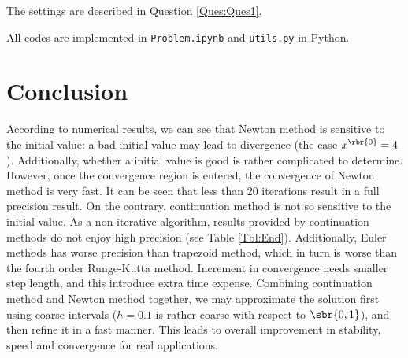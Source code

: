 \documentclass[english, nochinese]{pkupaper}
\begin{document}
The settings are described in Question \ref{Ques:Ques1}.

All codes are implemented in \verb"Problem.ipynb" and \verb"utils.py" in Python.

\section{Conclusion}

According to numerical results, we can see that Newton method is sensitive to the initial value: a bad initial value may lead to divergence (the case $ x^{\rbr{0}} = 4 $). Additionally, whether a initial value is good is rather complicated to determine. However, once the convergence region is entered, the convergence of Newton method is very fast. It can be seen that less than 20 iterations result in a full precision result. On the contrary, continuation method is not so sensitive to the initial value. As a non-iterative algorithm, results provided by continuation methods do not enjoy high precision (see Table \ref{Tbl:End}). Additionally, Euler methods has worse precision than trapezoid method, which in turn is worse than the fourth order Runge-Kutta method. Increment in convergence needs smaller step length, and this introduce extra time expense. Combining continuation method and Newton method together, we may approximate the solution first using coarse intervals ($ h = 0.1 $ is rather coarse with respect to $ \sbr{ 0, 1 } $), and then refine it in a fast manner. This leads to overall improvement in stability, speed and convergence for real applications.
\end{document}
